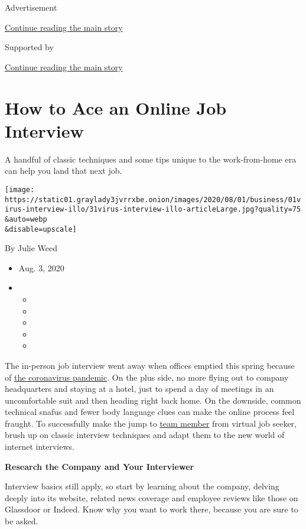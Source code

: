 Advertisement

\protect\hyperlink{after-top}{Continue reading the main story}

Supported by

\protect\hyperlink{after-sponsor}{Continue reading the main story}

\hypertarget{how-to-ace-an-online-job-interview}{%
\section{How to Ace an Online Job
Interview}\label{how-to-ace-an-online-job-interview}}

A handful of classic techniques and some tips unique to the
work-from-home era can help you land that next job.

\texttt{[image: https://static01.graylady3jvrrxbe.onion/images/2020/08/01/business/01virus-interview-illo/31virus-interview-illo-articleLarge.jpg?quality=75\\\&auto=webp\\\&disable=upscale]}

By Julie Weed

\begin{itemize}
\item
  Aug. 3, 2020
\item
  \begin{itemize}
  \item
  \item
  \item
  \item
  \item
  \end{itemize}
\end{itemize}

The in-person job interview went away when offices emptied this spring
because of
\href{https://www.nytimes3xbfgragh.onion/news-event/coronavirus}{the
coronavirus pandemic}. On the plus side, no more flying out to company
headquarters and staying at a hotel, just to spend a day of meetings in
an uncomfortable suit and then heading right back home. On the downside,
common technical snafus and fewer body language clues can make the
online process feel fraught. To successfully make the jump to
\href{https://www.nytimes3xbfgragh.onion/2020/06/21/business/work-home-coronavirus.html}{team
member} from virtual job seeker, brush up on classic interview
techniques and adapt them to the new world of internet interviews.

\textbf{Research the Company and Your Interviewer}

Interview basics still apply, so start by learning about the company,
delving deeply into its website, related news coverage and employee
reviews like those on Glassdoor or Indeed. Know why you want to work
there, because you are sure to be asked.

